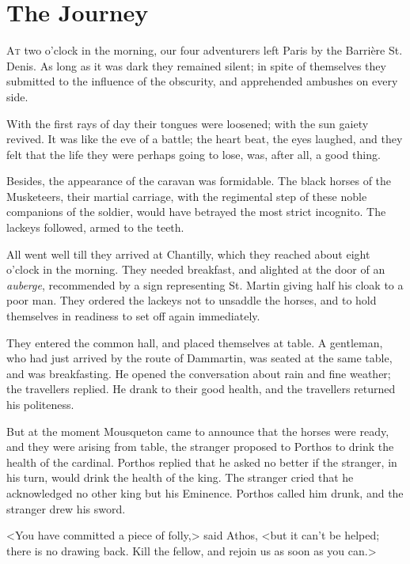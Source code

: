 
\chapter{The Journey}

\lettrine[]{A}{t} two o'clock in the morning, our four adventurers left Paris by the Barrière St. Denis. As long as it was dark they remained silent; in spite of themselves they submitted to the influence of the obscurity, and apprehended ambushes on every side. 

With the first rays of day their tongues were loosened; with the sun gaiety revived. It was like the eve of a battle; the heart beat, the eyes laughed, and they felt that the life they were perhaps going to lose, was, after all, a good thing. 

Besides, the appearance of the caravan was formidable. The black horses of the Musketeers, their martial carriage, with the regimental step of these noble companions of the soldier, would have betrayed the most strict incognito. The lackeys followed, armed to the teeth. 

All went well till they arrived at Chantilly, which they reached about eight o'clock in the morning. They needed breakfast, and alighted at the door of an \textit{auberge}, recommended by a sign representing St. Martin giving half his cloak to a poor man. They ordered the lackeys not to unsaddle the horses, and to hold themselves in readiness to set off again immediately. 

They entered the common hall, and placed themselves at table. A gentleman, who had just arrived by the route of Dammartin, was seated at the same table, and was breakfasting. He opened the conversation about rain and fine weather; the travellers replied. He drank to their good health, and the travellers returned his politeness. 

But at the moment Mousqueton came to announce that the horses were ready, and they were arising from table, the stranger proposed to Porthos to drink the health of the cardinal. Porthos replied that he asked no better if the stranger, in his turn, would drink the health of the king. The stranger cried that he acknowledged no other king but his Eminence. Porthos called him drunk, and the stranger drew his sword. 

<You have committed a piece of folly,> said Athos, <but it can't be helped; there is no drawing back. Kill the fellow, and rejoin us as soon as you can.> 

